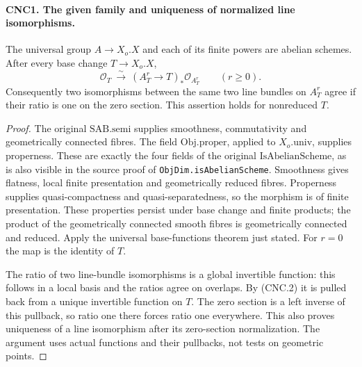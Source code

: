 \documentclass[11pt,a4paper]{article}
\numberwithin{equation}{section}
\theoremstyle{remark}\newtheorem{remark}[theorem]{Remark}
\begin{document}
\paragraph{CNC1. The given family and uniqueness of normalized line isomorphisms.}
\label{claim:CNC1}
The universal group \(A\to X_o.X\) and each of its finite powers are
abelian schemes.  After every base change \(T\to X_o.X\),
\[
 \mathcal O_T\ \xrightarrow{\ \sim\ }\ (A_T^r\to T)_*
                       \mathcal O_{A_T^r}\qquad(r\geq0).       \tag{CNC.2}
\]
Consequently two isomorphisms between the same two line bundles on
\(A_T^r\) agree if their ratio is one on the zero section.  This assertion
holds for nonreduced \(T\).
\begin{proof}
The original \(\mathrm{SAB}.\mathrm{semi}\) supplies smoothness,
commutativity and geometrically connected fibres.  The field
\(\mathrm{Obj}.\mathrm{proper}\), applied to \(X_o.\mathrm{univ}\),
supplies properness.  These are exactly the four fields of the original
\(\mathrm{IsAbelianScheme}\), as is also visible in the source proof of
\texttt{Obj\allowbreak Dim.\allowbreak is\allowbreak Abelian\allowbreak Scheme}.  Smoothness gives flatness, local finite
presentation and geometrically reduced fibres.  Properness supplies
quasi-compactness and quasi-separatedness, so the morphism is of finite
presentation.  These properties persist under base change and finite
products; the product of the geometrically connected smooth fibres is
geometrically connected and reduced.  Apply the universal base-functions
theorem just stated.  For \(r=0\) the map is the identity of \(T\).

The ratio of two line-bundle isomorphisms is a global invertible
function: this follows in a local basis and the ratios agree on overlaps.
By (CNC.2) it is pulled back from a unique invertible function on \(T\).
The zero section is a left inverse of this pullback, so ratio one there
forces ratio one everywhere.  This also proves uniqueness of a line
isomorphism after its zero-section normalization.  The argument uses
actual functions and their pullbacks, not tests on geometric points.
\end{proof}

\end{document}
